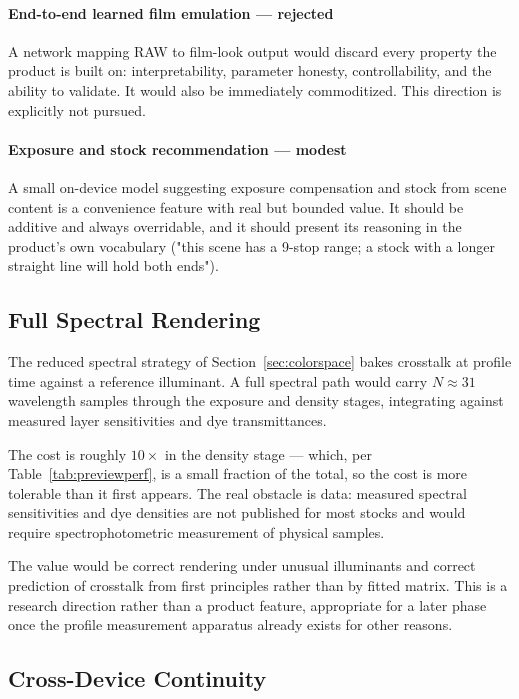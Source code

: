 \paragraph{End-to-end learned film emulation --- rejected} A network mapping
RAW to film-look output would discard every property the product is built on:
interpretability, parameter honesty, controllability, and the ability to
validate. It would also be immediately commoditized. This direction is
explicitly not pursued.

\paragraph{Exposure and stock recommendation --- modest} A small on-device
model suggesting exposure compensation and stock from scene content is a
convenience feature with real but bounded value. It should be additive and
always overridable, and it should present its reasoning in the product's own
vocabulary ("this scene has a 9-stop range; a stock with a longer straight line
will hold both ends").

\subsection{Full Spectral Rendering}

The reduced spectral strategy of Section~\ref{sec:colorspace} bakes crosstalk at
profile time against a reference illuminant. A full spectral path would carry
$N \approx 31$ wavelength samples through the exposure and density stages,
integrating against measured layer sensitivities and dye transmittances.

The cost is roughly $10\times$ in the density stage --- which, per
Table~\ref{tab:previewperf}, is a small fraction of the total, so the cost is
more tolerable than it first appears. The real obstacle is data: measured
spectral sensitivities and dye densities are not published for most stocks and
would require spectrophotometric measurement of physical samples.

The value would be correct rendering under unusual illuminants and correct
prediction of crosstalk from first principles rather than by fitted matrix.
This is a research direction rather than a product feature, appropriate for a
later phase once the profile measurement apparatus already exists for other
reasons.

\subsection{Cross-Device Continuity}

